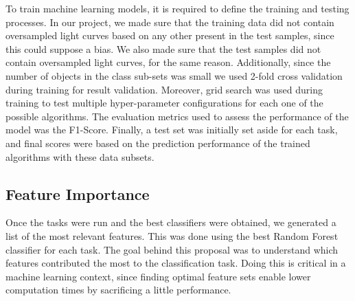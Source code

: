 To train machine learning models, it is required to define the training and testing processes. In our project, we made sure that the training data did not contain oversampled light curves based on any other present in the test samples, since this could suppose a bias. We also made sure that the test samples did not contain oversampled light curves, for the same reason. Additionally, since the number of objects in the class sub-sets was small we used 2-fold cross validation during training for result validation. Moreover, grid search was used during training to test multiple hyper-parameter configurations for each one of the possible algorithms. The evaluation metrics used to assess the performance of the model was the F1-Score. Finally, a test set was initially set aside for each task, and final scores were based on the prediction performance of the trained algorithms with these data subsets.


\subsection{Feature Importance} \label{subsection_importances}

Once the tasks were run and the best classifiers were obtained, we generated a list of the most relevant features. This was done using the best Random Forest classifier for each task. The goal behind this proposal was to understand which features contributed the most to the classification task. Doing this is critical in a machine learning context, since finding optimal feature sets enable lower computation times by sacrificing a little performance.